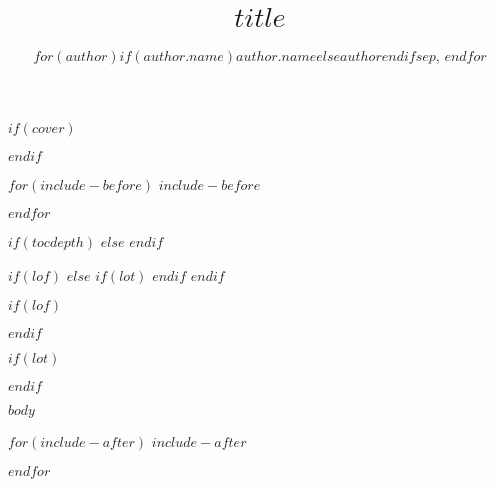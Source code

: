 \documentclass[twoside]{extreport}
\title{$title$}
\author{$for(author)$$if(author.name)$$author.name$$else$$author$$endif$$sep$, $endfor$}
\begin{document}
$if(cover)$

$endif$
\maketitle
{}

$for(include-before)$
$include-before$

$endfor$


\clearpage

$if(tocdepth)$
\setcounter{tocdepth}{$tocdepth$}
$else$
\setcounter{tocdepth}{3}
$endif$
\tableofcontents
{}

$if(lof)$
\clearpage
$else$
  $if(lot)$
\clearpage
  $endif$
$endif$

$if(lof)$
\listoffigures
{}
\vspace{34pt}
$endif$

$if(lot)$
\listoftables
{}
$endif$

\clearpage


$body$

$for(include-after)$
$include-after$

$endfor$
\end{document}
